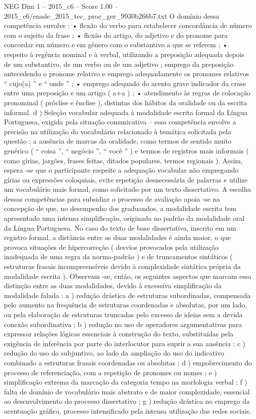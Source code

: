 \begin{textsample}{NEG Dim 1 – 2015\_c6 – Score 1.00 – 2015\_c6/enade\_2015\_tec\_proc\_ger\_9930b266b7.txt}
O domínio dessa competência envolve : • flexão do verbo para estabelecer concordância de número com o sujeito da frase ; • flexão do artigo, do adjetivo e do pronome para concordar em número e em gênero com o substantivo a que se referem ; • respeito à regência nominal e à verbal, utilizando a preposição adequada depois de um substantivo, de um verbo ou de um adjetivo ; emprego da preposição antecedendo o pronome relativo e emprego adequadamente os pronomes relativos “ cujo(a) ” e “ onde ” ; • emprego adequado do acento grave indicador da crase entre uma preposição e um artigo ( a+a ) ; • atendimento às regras de colocação pronominal ( próclise e ênclise ), distintas dos hábitos da oralidade ou da escrita informal. d ) Seleção vocabular adequada à modalidade escrita formal da Língua Portuguesa, exigida pela situação comunicativa – essa competência envolve a precisão na utilização do vocabulário relacionado à temática solicitada pela questão ; a ausência de marcas da oralidade, como termos de sentido muito genérico ( “ coisa ”, “ negócio ”, “ você ” ) e termos de registros mais informais ( como gírias, jargões, frases feitas, ditados populares, termos regionais ).
Assim, espera -se que o participante respeite a adequação vocabular não empregando gírias ou expressões coloquiais, evite repetição desnecessária de palavras e utilize um vocabulário mais formal, como solicitado por um texto dissertativo.
A escolha dessas competências para subsidiar o processo de avaliação apoia -se na concepção de que, no desempenho dos graduandos, a modalidade escrita tem apresentado uma intensa simplificação, originada no padrão da modalidade oral da Língua Portuguesa.
No caso do texto de base dissertativa, inscrito em um registro formal, a distância entre as duas modalidades é ainda maior, o que provoca situações de hipercorreção ( desvios provocados pela utilização inadequada de uma regra da norma-padrão ) e de truncamentos sintáticos ( estruturas frasais incompreensíveis devido à complexidade sintática própria da modalidade escrita ).
Observam -se, então, os seguintes aspectos que marcam essa distinção entre as duas modalidades, devido à excessiva simplificação da modalidade falada : a ) redução drástica de estruturas subordinadas, compensada pelo aumento na frequência de estruturas coordenadas e absolutas, por um lado, ou pela elaboração de estruturas truncadas pelo excesso de ideias sem a devida conexão subordinativa ; b ) redução no uso de operadores argumentativas para expressar relações lógicas essenciais à construção do texto, substituídas pela exigência de inferência por parte do interlocutor para suprir a sua ausência ; c ) redução do uso do subjuntivo, ao lado da ampliação do uso do indicativo combinado a estruturas frasais coordenadas ou absolutas ; d ) empobrecimento do processo de referenciação, com a repetição de pronomes ou nomes ; e ) simplificação extrema da marcação da categoria tempo na morfologia verbal ; f ) falta de domínio de vocabulário mais abstrato e de maior complexidade, essencial ao desenvolvimento do processo dissertativo ; g ) redução drástica no emprego da acentuação gráfica, processo intensificado pela intensa utilização das redes sociais.

\end{textsample}
